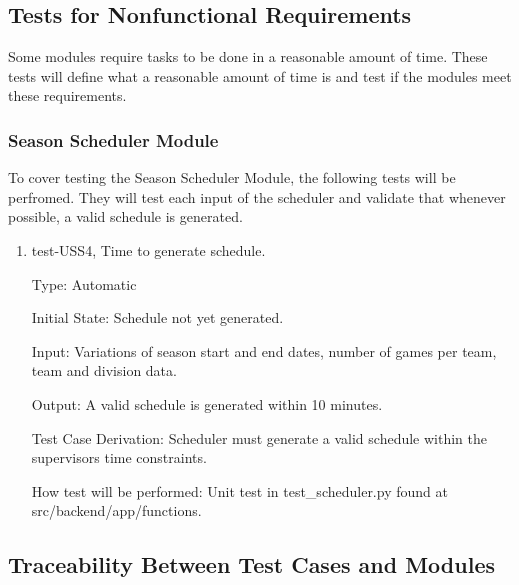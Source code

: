 \documentclass[12pt, titlepage]{article}
\begin{document}
\subsection{Tests for Nonfunctional Requirements}



Some modules require tasks to be done in a reasonable amount of time. These
tests will define what a reasonable amount of time is and test if the modules
meet these requirements.

\subsubsection{Season Scheduler Module}

To cover testing the Season Scheduler Module, the following tests will be
perfromed. They will test each input of the scheduler and validate that
whenever possible, a valid schedule is generated.

\begin{enumerate}

\item{test-USS4, Time to generate schedule.\\}

Type: Automatic

Initial State: Schedule not yet generated.

Input: Variations of season start and end dates, number of games per
team, team and division data.

Output: A valid schedule is generated within 10 minutes.

Test Case Derivation: Scheduler must generate a valid schedule within the
supervisors time constraints.

How test will be performed: Unit test in test\_scheduler.py found at
src/backend/app/functions.

\end{enumerate}

\subsection{Traceability Between Test Cases and Modules}
\end{document}
